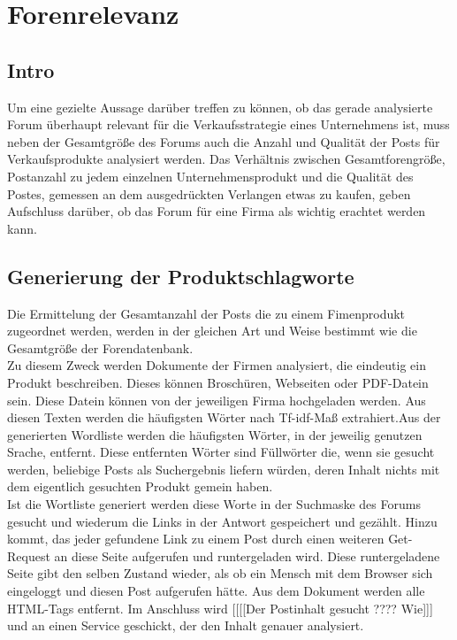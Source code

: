 \section{Forenrelevanz}
\subsection{Intro}
Um eine gezielte Aussage darüber treffen zu können, ob das gerade analysierte Forum überhaupt relevant für die Verkaufsstrategie eines Unternehmens ist, muss neben der Gesamtgröße des Forums auch die Anzahl und Qualität der Posts für Verkaufsprodukte analysiert werden. Das Verhältnis zwischen Gesamtforengröße, Postanzahl zu jedem einzelnen Unternehmensprodukt und die Qualität des Postes, gemessen an dem ausgedrückten Verlangen etwas zu kaufen, geben Aufschluss darüber, ob das Forum für eine Firma als wichtig erachtet werden kann.
\subsection{Generierung der Produktschlagworte}
Die Ermittelung der Gesamtanzahl der Posts die zu einem Fimenprodukt zugeordnet werden, werden in der gleichen Art und Weise bestimmt wie die Gesamtgröße der Forendatenbank.\\
Zu diesem Zweck werden Dokumente der Firmen analysiert, die eindeutig ein Produkt beschreiben. Dieses können Broschüren, Webseiten oder PDF-Datein sein. Diese Datein können von der jeweiligen Firma hochgeladen werden. Aus diesen Texten werden die häufigsten Wörter nach Tf-idf-Maß extrahiert.Aus der generierten Wordliste werden die häufigsten Wörter, in der jeweilig genutzen Srache, entfernt. Diese entfernten Wörter sind Füllwörter die, wenn sie gesucht werden, beliebige Posts als Suchergebnis liefern würden, deren Inhalt nichts mit dem eigentlich gesuchten Produkt gemein haben.\\
Ist die Wortliste generiert werden diese Worte in der Suchmaske des Forums gesucht und wiederum die Links in der Antwort gespeichert und gezählt. Hinzu kommt, das jeder gefundene Link zu einem Post durch einen weiteren Get-Request an diese Seite aufgerufen und runtergeladen wird. Diese runtergeladene Seite gibt den selben Zustand wieder, als ob ein Mensch mit dem Browser sich eingeloggt und diesen Post aufgerufen hätte. Aus dem Dokument werden alle HTML-Tags entfernt. Im Anschluss wird [[[[Der Postinhalt gesucht ???? Wie]]] und an einen Service geschickt, der den Inhalt genauer analysiert. 
